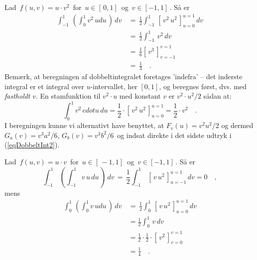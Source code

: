 \begin{example} \label{exDobbeltInt}
Lad $\,f(u,v) = u \cdot v^{2}\,$ for $\,u \in [\,0,1]\,$ og $\, v \in [-1, 1]\,$. Så er
\begin{equation}
\begin{aligned}
\int_{-1}^{1}\, \left(
\int_{0}^{1} v^{2}\,u du \, \right)\, dv \, &= \, \frac{1}{2}\int_{-1}^{1}\, [\,v^{2}\,u^{2}\,]_{u=0}^{u=1}\, dv \\ &= \,
\frac{1}{2}\int_{-1}^{1}\, v^{2}\, dv \\ &= \,
\frac{1}{6}[\,v^{3}\,]_{v=-1}^{v=1} \\ &= \, \frac{1}{3} \quad .
\end{aligned}
\end{equation}
Bemærk, at beregningen af dobbeltintegralet foretages 'indefra' -- det inderste integral er et integral over $u$-intervallet, her $[0, 1]$, og beregnes først, dvs. med \emph{fastholdt} $v$. En stamfunktion til  $v^{2}\cdot u$ med konstant $v$ er $v^{2} \cdot u^{2}/2$ sådan at:
\begin{equation}
\int_{0}^{1} v^{2}\,cdot u \, du = \frac{1}{2}\cdot[\,v^{2}\,u^{2}\,]_{u=0}^{u=1} = \frac{1}{2}\cdot v^{2} \quad .
\end{equation}
I beregningen kunne vi alternativt have benyttet, at $F_{v}(u) = v^{2}u^{2}/2$ og dermed  $G_{a}(v) = v^{3}a^{2}/6$, $G_{b}(v) = v^{3}b^{2}/6 \,$ og indsat direkte i det sidste udtryk i (\ref{eqDobbeltInt2}).
\end{example}


\begin{example} \label{exDobbeltIntUV}
Lad $\,f(u,v) = u\cdot v\,$ for $\,u \in [\,-1,1]\,$ og $\, v \in [-1, 1]\,$. Så er
\begin{equation}
\int_{-1}^{1}\, \left(
\int_{-1}^{1} v\,u \, du \, \right)\, dv \, = \, \frac{1}{2}\int_{-1}^{1}\, [\,v\,u^{2}\,]_{u=-1}^{u=1}\, dv = 0 \quad ,
\end{equation}
mens
\begin{equation}
\begin{aligned}
\int_{0}^{1}\, \left(
\int_{0}^{1} v\,u du \, \right)\, dv \, &= \, \frac{1}{2}\int_{0}^{1}\, [\,v\,u^{2}\,]_{u=0}^{u=1}\, dv  \\
&= \frac{1}{2}\int_{0}^{1}\, v\, dv  \\
&= \frac{1}{2}\cdot \frac{1}{2} \cdot [\,v^{2}\,]_{v=0}^{v=1} \\
&= \frac{1}{4}
\quad .
 \end{aligned}
\end{equation}
\end{example}







